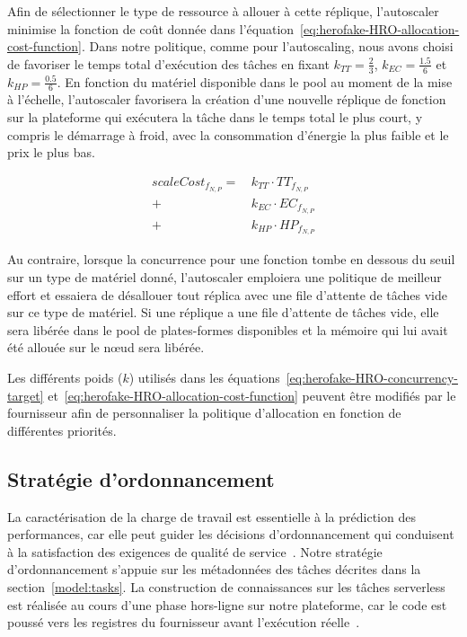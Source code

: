 Afin de sélectionner le type de ressource à allouer à cette réplique, l'autoscaler minimise la fonction de coût donnée dans l'équation~\ref{eq:herofake-HRO-allocation-cost-function}. 
Dans notre politique, comme pour l'autoscaling, nous avons choisi de favoriser le temps total d'exécution des tâches en fixant $k_{TT} = \frac{2}{3}$, $k_{EC} = \frac{1.5}{6}$ et $k_{HP} = \frac{0.5}{6}$. 
En fonction du matériel disponible dans le pool au moment de la mise à l'échelle, l'autoscaler favorisera la création d'une nouvelle réplique de fonction sur la plateforme qui exécutera la tâche dans le temps total le plus court, y compris le démarrage à froid, avec la consommation d'énergie la plus faible et le prix le plus bas.

\begin{equation}
\begin{split}
    scaleCost_{{f}_{N, P}} = \, &k_{TT} \cdot {TT}_{{f}_{N, P}} \\
    + &k_{EC} \cdot {EC}_{{f}_{N, P}} \\
    + &k_{HP} \cdot {HP}_{{f}_{N, P}}
\end{split}
\label{eq:herofake-HRO-allocation-cost-function}
\end{equation}

Au contraire, lorsque la concurrence pour une fonction tombe en dessous du seuil sur un type de matériel donné, l'autoscaler emploiera une politique de meilleur effort et essaiera de désallouer tout réplica avec une file d'attente de tâches vide sur ce type de matériel. Si une réplique a une file d'attente de tâches vide, elle sera libérée dans le pool de plates-formes disponibles et la mémoire qui lui avait été allouée sur le nœud sera libérée.

Les différents poids ($k$) utilisés dans les équations~\ref{eq:herofake-HRO-concurrency-target} et~\ref{eq:herofake-HRO-allocation-cost-function} peuvent être modifiés par le fournisseur afin de personnaliser la politique d'allocation en fonction de différentes priorités.

\subsection{Stratégie d'ordonnancement} \label{section:herofake-scheduling-strategy}

La caractérisation de la charge de travail est essentielle à la prédiction des performances, car elle peut guider les décisions d'ordonnancement qui conduisent à la satisfaction des exigences de qualité de service~\cite{mampageHolisticViewResource2022}. Notre stratégie d'ordonnancement s'appuie sur les métadonnées des tâches décrites dans la section~\ref{model:tasks}. La construction de connaissances sur les tâches serverless est réalisée au cours d'une phase hors-ligne sur notre plateforme, car le code est poussé vers les registres du fournisseur avant l'exécution réelle~\cite{shahradServerlessWildCharacterizing}.

